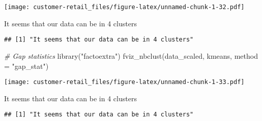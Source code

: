 \documentclass[
]{article}
\newenvironment{Shaded}{\begin{snugshade}}{\end{snugshade}}
\newcommand{\AttributeTok}[1]{\textcolor[rgb]{0.77,0.63,0.00}{#1}}
\newcommand{\CommentTok}[1]{\textcolor[rgb]{0.56,0.35,0.01}{\textit{#1}}}
\newcommand{\FunctionTok}[1]{\textcolor[rgb]{0.00,0.00,0.00}{#1}}
\newcommand{\NormalTok}[1]{#1}
\newcommand{\StringTok}[1]{\textcolor[rgb]{0.31,0.60,0.02}{#1}}
\begin{document}
\texttt{[image: customer-retail\_files/figure-latex/unnamed-chunk-1-32.pdf]}

\begin{Shaded}
\begin{Highlighting}[]
\StringTok{\textquotesingle{}It seems that our data can be in 4 clusters\textquotesingle{}}
\end{Highlighting}
\end{Shaded}

\begin{verbatim}
## [1] "It seems that our data can be in 4 clusters"
\end{verbatim}

\begin{Shaded}
\begin{Highlighting}[]
\CommentTok{\# Gap statistics}
\FunctionTok{library}\NormalTok{(}\StringTok{"factoextra"}\NormalTok{)}
\FunctionTok{fviz\_nbclust}\NormalTok{(data\_scaled, kmeans, }\AttributeTok{method =} \StringTok{"gap\_stat"}\NormalTok{)}
\end{Highlighting}
\end{Shaded}

\texttt{[image: customer-retail\_files/figure-latex/unnamed-chunk-1-33.pdf]}

\begin{Shaded}
\begin{Highlighting}[]
\StringTok{\textquotesingle{}It seems that our data can be in 4 clusters\textquotesingle{}}
\end{Highlighting}
\end{Shaded}

\begin{verbatim}
## [1] "It seems that our data can be in 4 clusters"
\end{verbatim}
\end{document}
